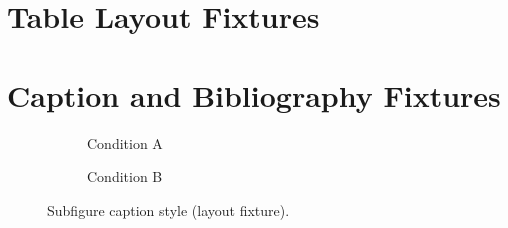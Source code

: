 \documentclass[12pt]{apmcmthesis}
\begin{document}
\hypersetup{pageanchor=true}
\pagestyle{mainmatterstyle}
\section{Table Layout Fixtures}


\clearpage


\clearpage


\clearpage


\clearpage
\section{Caption and Bibliography Fixtures}
\begin{figure}[htbp]\centering
  \begin{subfigure}{.48\linewidth}\centering
    \caption{Condition A}
  \end{subfigure}\hfill
  \begin{subfigure}{.48\linewidth}\centering
    \caption{Condition B}
  \end{subfigure}
  \caption{Subfigure caption style (layout fixture).}
\end{figure}


\end{document}
